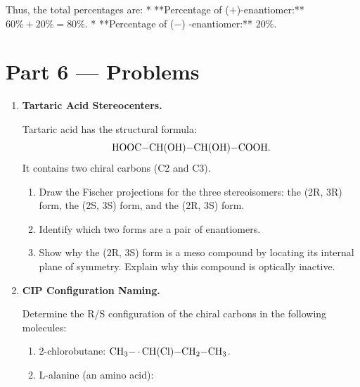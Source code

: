 \documentclass[12pt, a4paper]{book}
\begin{document}
\begin{problembox}
\begin{enumerate}[label=\textbf{E\arabic*.}]
        Thus, the total percentages are:
        * **Percentage of ($+$)-enantiomer:** $60\% + 20\% = 80\%$.
        * **Percentage of ($-$) -enantiomer:** $20\%$.
\end{enumerate}
\end{problembox}

\newpage

\section{Part 6 --- Problems}

\begin{problembox}
\begin{enumerate}[label=\textbf{P\arabic*.}]
  \item \textbf{Tartaric Acid Stereocenters.}
  
        Tartaric acid has the structural formula:
        \[
          \ce{HOOC-CH(OH)-CH(OH)-COOH}.
        \]
        It contains two chiral carbons (C2 and C3).
        \begin{enumerate}[label=(\alph*)]
          \item Draw the Fischer projections for the three stereoisomers: the (2R, 3R) form, the (2S, 3S) form, and the (2R, 3S) form.
          \item Identify which two forms are a pair of enantiomers.
          \item Show why the (2R, 3S) form is a meso compound by locating its internal plane of symmetry. Explain why this compound is optically inactive.
        \end{enumerate}

  \item \textbf{CIP Configuration Naming.}
  
        Determine the R/S configuration of the chiral carbons in the following molecules:
        \begin{enumerate}[label=(\alph*)]
          \item 2-chlorobutane: $\ce{CH3-*CH(Cl)-CH2-CH3}$.
          \item L-alanine (an amino acid):
                \begin{center}
                \end{center}
        \end{enumerate}
\end{enumerate}
\end{problembox}
\end{document}
